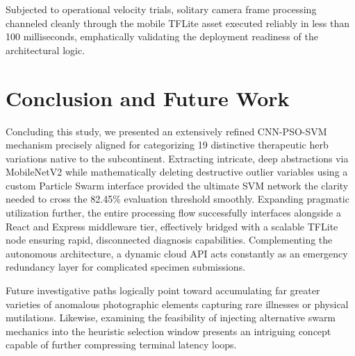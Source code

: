 \documentclass[conference]{IEEEtran}
\begin{document}
Subjected to operational velocity trials, solitary camera frame processing channeled cleanly through the mobile TFLite asset executed reliably in less than 100 milliseconds, emphatically validating the deployment readiness of the architectural logic.

\section{Conclusion and Future Work}

Concluding this study, we presented an extensively refined CNN-PSO-SVM mechanism precisely aligned for categorizing 19 distinctive therapeutic herb variations native to the subcontinent. Extracting intricate, deep abstractions via MobileNetV2 while mathematically deleting destructive outlier variables using a custom Particle Swarm interface provided the ultimate SVM network the clarity needed to cross the 82.45\% evaluation threshold smoothly. Expanding pragmatic utilization further, the entire processing flow successfully interfaces alongside a React and Express middleware tier, effectively bridged with a scalable TFLite node ensuring rapid, disconnected diagnosis capabilities. Complementing the autonomous architecture, a dynamic cloud API acts constantly as an emergency redundancy layer for complicated specimen submissions.

Future investigative paths logically point toward accumulating far greater varieties of anomalous photographic elements capturing rare illnesses or physical mutilations. Likewise, examining the feasibility of injecting alternative swarm mechanics into the heuristic selection window presents an intriguing concept capable of further compressing terminal latency loops.
\end{document}
